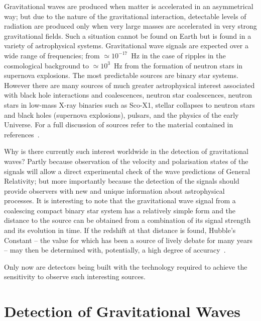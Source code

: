 \documentclass{article}
\begin{document}
Gravitational waves are produced when matter is accelerated in an asymmetrical
way; but due to the nature of the gravitational interaction, detectable levels
of radiation are produced only when very large masses are accelerated in very
strong gravitational fields. Such a situation cannot be found on Earth but is
found in a variety of astrophysical systems. Gravitational wave signals are
expected over a wide range of frequencies; from $\simeq 10^{-17}$~Hz in the case
of ripples in the cosmological background to $\simeq 10^3$~Hz from the formation
of neutron stars in supernova explosions. The most predictable sources are
binary star systems. However there are many sources of much greater
astrophysical interest associated with black hole interactions and coalescences,
neutron star coalescences, neutron stars in low-mass X-ray binaries such as
Sco-X1, stellar collapses to neutron stars and black holes (supernova
explosions), pulsars, and the physics of the early Universe. For a full
discussion of sources refer to the material contained in
references~\cite{Sathyaprakash:2009,LISAsymposium, sources, Amaldiproc}.

Why is there currently such interest worldwide in the detection of gravitational
waves? Partly because observation of the velocity and polarisation states of the
signals will allow a direct experimental check of the wave predictions of
General Relativity; but more importantly because the detection of the signals
should provide observers with new and unique information about astrophysical
processes. It is interesting to note that the gravitational wave signal from a
coalescing compact binary star system has a relatively simple form and the
distance to the source can be obtained from a combination of its signal strength
and its evolution in time. If the redshift at that distance is found, Hubble's
Constant -- the value for which has been a source of lively debate for many
years -- may then be determined with, potentially, a high degree of
accuracy~\cite{Schutz,Holtz:2005}.

Only now are detectors being built with the technology required to achieve the
sensitivity to observe such interesting sources.


\newpage

\section{Detection of Gravitational Waves}
\label{section:Detection}
\end{document}
